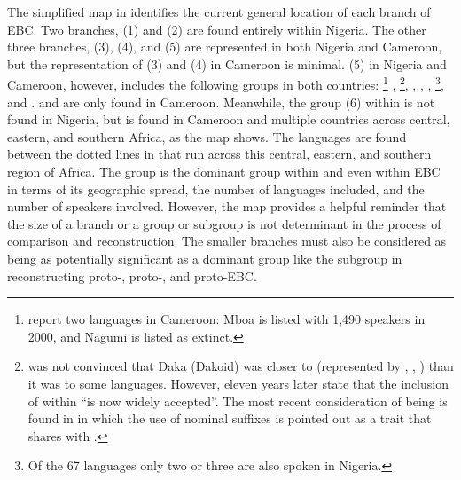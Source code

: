 \documentclass[output=paper]{langsci/langscibook}
\begin{document}
\newpage 
The simplified map in  identifies the current general location of each branch of EBC. Two branches, 
 (1) and 
 (2) are found entirely within Nigeria. The other three branches, 
 (3), 
 (4), and 
 (5) 
are represented in both Nigeria and Cameroon, but the representation of 
 (3) and 
 (4) in Cameroon is minimal. 
 (5) 
in Nigeria and Cameroon, however, includes the following groups in both countries: \footnote{  \citet{SimonsFennig2018} report two  languages in Cameroon: Mboa is listed with 1,490 speakers in 2000, and Nagumi is listed as extinct.} , \footnote{\citet[182-183]{Boyd1989} was not convinced that Daka (Dakoid) was closer to  (represented by , , ) than it was to some  languages. However, eleven years later    \citet[27]{WilliamsonBlench2000} state that the inclusion of  within  “is now widely accepted”. The most recent consideration of  being  is found in \citet{Blench2012} in which the use of nominal suffixes is pointed out as a trait that  shares with .}, , , , \footnote{Of the 67  languages only two or three are also spoken in Nigeria.}, and .  and  are only found in Cameroon. Meanwhile, the  group (6) within  is not found in Nigeria, but is found in Cameroon and multiple countries across central, eastern, and southern Africa, as the map shows. The  languages are found between the dotted lines in  that run across this central, eastern, and southern region of Africa. The  group is the dominant group within  and even within EBC in terms of its geographic spread, the number of languages included, and the number of speakers involved. However, the map provides a helpful reminder that the size of a branch or a group or subgroup is not determinant in the process of comparison and reconstruction. The smaller branches must also be considered as being as potentially significant as a dominant group like the  subgroup in reconstructing proto-, proto-, and proto-EBC. 
\end{document}

